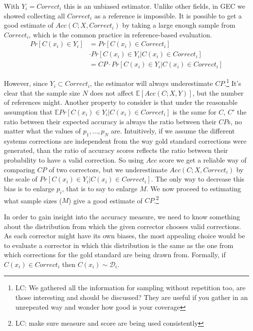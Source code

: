 \documentclass[letter,11pt]{article}
\newcommand{\lc}[1]{\footnote{\color{green}LC: #1}}
\begin{document}
With $Y_i=Correct_i$ this is an unbiased estimator. Unlike other fields, in GEC we showed collecting all $Correct_i$ as a reference is impossible. It is possible to get a good estimate of $Acc(C;X,Correct_i)$
by taking a large enough sample from $Correct_i$, which is the common practice in reference-based evaluation.
\begin{align}\label{eq:correction-in-gs}
Pr[C(x_i) \in Y_i] &= 
Pr[C(x_i) \in Correct_i]\\\nonumber&
 \cdot Pr[C(x_i) \in Y_i | C(x_i) \in Correct_i]\\
&= CP\cdot Pr[C(x_i) \in Y_i | C(x_i) \in Correct_i]\nonumber
\end{align}

 However,
since $Y_i \subset Correct_i$, the estimator will always underestimate $CP$.\lc{We gathered all the information for sampling without repetition too, are those interesting and should be discussed? They are useful if you gather in an unrepeated way and wonder how good is your coverage }
It's clear that the sample size $N$ does not affect $\mathbb{E}[Acc(C;X,Y)]$, but the number of references
might. Another property to consider is that under the reasonable assumption that $\mathbb{E}Pr[C(x_i) \in Y_i | C(x_i) \in Correct_i]$ is the same for $C$, $C'$ the ratio between their expected accuracy
is always the ratio between their $CP$s, no matter what the values of $p_1,\ldots,p_N$ are. Intuitively, if we assume the different systems corrections are independent from the way gold standard corrections were generated, than the ratio of accuracy scores reflects the ratio between their probability to have a valid correction.
So using $Acc$ score we get a reliable way of comparing $CP$ of two correctors,
but we underestimate $Acc\left(C;X,Correct_i\right)$ by the scale of $Pr\left[C\left(x_i\right) \in Y_i | C\left(x_i\right) \in Correct_i\right]$. The only way to decrease this bias
is to enlarge $p_i$, that is to say to enlarge $M$. 
We now proceed to estimating what sample sizes ($M$) give a good estimate of $CP$.\lc{make sure measure and score are being used consistently}

In order to gain insight into the accuracy measure, we need to know something about the distribution from which the given corrector chooses valid corrections. As each corrector might have its own biases, the most appealing choice would be to evaluate a corrector in which this distribution is the same as the one from which corrections for the gold standard are being drawn from. Formally, if $C\left(x_i\right) \in Correct_i$ then $C\left(x_i\right) \sim \mathcal{D}_i$. 
\end{document}
